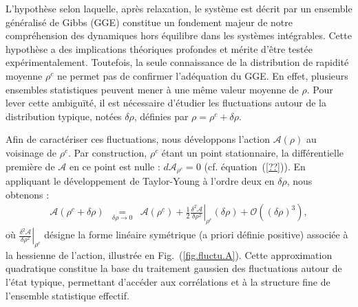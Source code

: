 {%


}





L’hypothèse selon laquelle, après relaxation, le système est décrit par un ensemble généralisé de Gibbs (GGE) constitue un fondement majeur de notre compréhension des dynamiques hors équilibre dans les systèmes intégrables. Cette hypothèse a des implications théoriques profondes et mérite d’être testée expérimentalement. Toutefois, la seule connaissance de la distribution de rapidité moyenne \( \rho^c \) ne permet pas de confirmer l'adéquation du GGE. En effet, plusieurs ensembles statistiques peuvent mener à une même valeur moyenne de \( \rho \). Pour lever cette ambiguïté, il est nécessaire d’étudier les fluctuations autour de la distribution typique, notées \( \delta \rho \), définies par \( \rho = \rho^c + \delta \rho \).

Afin de caractériser ces fluctuations, nous développons l’action \( \mathcal{A}(\rho) \) au voisinage de \( \rho^c \). Par construction, \( \rho^c \) étant un point stationnaire, la différentielle première de \( \mathcal{A} \) en ce point est nulle : \( d\mathcal{A}_{\rho^c} = 0 \) (cf. équation~(\ref{??})). En appliquant le développement de Taylor-Young à l’ordre deux en \( \delta \rho \), nous obtenons :
\begin{eqnarray*}
	\mathcal{A}(\rho^c + \delta \rho) & \underset{ \delta \rho \to 0 }{=} & \mathcal{A}(\rho^c)  + \frac{1}{2} \left. \frac{\delta^2 \mathcal{A}}{\delta \rho^2} \right|_{\rho^c} (\delta \rho) + \mathcal{O}((\delta \rho)^3),
\end{eqnarray*}
où \( \left. \frac{\delta^2 \mathcal{A}}{\delta \rho^2} \right|_{\rho^c} \) désigne la forme linéaire symétrique (a priori définie positive) associée à la hessienne de l’action, illustrée en Fig.~(\ref{fig.fluctu.A}). Cette approximation quadratique constitue la base du traitement gaussien des fluctuations autour de l’état typique, permettant d’accéder aux corrélations et à la structure fine de l’ensemble statistique effectif.





